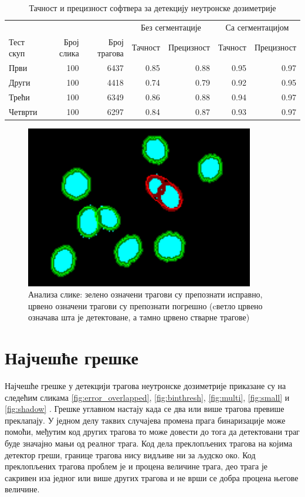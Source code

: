 \documentclass[12pt,a4paper,serbian,oneside]{book}
\begin{document}
\begin{table}[H]
\centering%
\caption{Тачност и прецизност софтвера за детекцију неутронске дозиметрије}
\begin{tabular}{lrrrrrr}
\hline
& & & \multicolumn{2}{c}{Без сегментације} & \multicolumn{2}{c}{Са сегментацијом} \\
Тест скуп & Број слика & Број трагова & Тачност & Прецизност & Тачност &  Прецизност \\
\hline
Први & 100 & 6437 & 0.85 & 0.88 & 0.95 & 0.97 \\
Други & 100 & 4418 & 0.74 & 0.79 & 0.92 & 0.95 \\
Трећи & 100 & 6349 & 0.86 & 0.88 & 0.94 & 0.97 \\
Четврти & 100 & 6297 & 0.84 & 0.87 & 0.93 & 0.97 \\
\hline
\end{tabular}
\label{tab:metrics}
\end{table} 

\begin{figure}[H]
\begin{center}
\includegraphics[width=100mm]{images/analysis.png}
\end{center}
\caption{Анализа слике: зелено означени трагови су препознати исправно, црвено означени трагови су препознати погрешно (cветло црвено означава шта је детектоване, а тамно црвено стварне трагове) }
\label{fig:analysis}
\end{figure}

\section{Најчешће грешке}

Најчешће грешке у детекцији трагова неутронске дозиметрије приказане су на следећим сликама \ref{fig:error_overlapped}, \ref{fig:binthresh}, \ref{fig:multi}, \ref{fig:small} и \ref{fig:shadow} . Грешке углавном настају када се два или више  трагова превише преклапају. У једном делу таквих случајева промена прага бинаризације може помоћи, међутим код других трагова то може довести до тога да детектовани траг буде значајно мањи од реалног трага. Код дела преклопљених трагова на којима детектор греши,  границе трагова нису видљиве ни за људско око. Код преклопљених трагова проблем је и процена величине трага, део трага је сакривен иза једног или више других трагова и не врши се добра процена његове величине.
\end{document}
